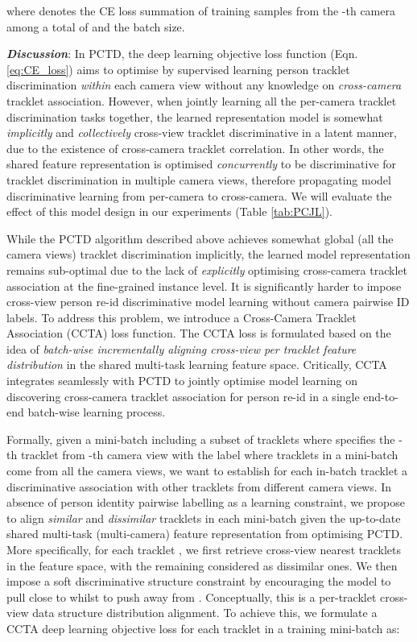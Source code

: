 \documentclass[runningheads]{llncs}
\begin{document}
where  denotes the CE loss summation of training samples
from the -th camera among a total of  and 
 the batch size.


\textbf{\em Discussion}: 
In PCTD, the deep learning objective loss function
(Eqn. \eqref{eq:CE_loss}) aims to optimise by supervised learning
person tracklet discrimination {\em within} each camera view without
any knowledge on {\em cross-camera} tracklet association. 
However, when jointly learning all the per-camera tracklet
discrimination tasks together, the learned representation model is
somewhat {\em implicitly} and {\em collectively} cross-view
tracklet discriminative in a latent manner, due to the existence of cross-camera tracklet
correlation.
In other words,
the shared feature representation is optimised {\em concurrently} to
be discriminative for tracklet discrimination in multiple camera
views, therefore propagating model discriminative learning from per-camera
to cross-camera. We will evaluate the effect of this model design in
our experiments (Table \ref{tab:PCJL}).


While the PCTD algorithm described above 
achieves somewhat global (all the camera views) tracklet discrimination implicitly, the learned
model representation remains sub-optimal due to the lack of {\em
  explicitly} optimising cross-camera tracklet association at the
fine-grained instance level.
It is significantly harder to impose cross-view person re-id
discriminative model learning without camera pairwise ID labels.
To address this problem,
we introduce a Cross-Camera Tracklet Association (CCTA) loss function.
The CCTA loss is formulated based on the idea of 
{\em batch-wise incrementally aligning cross-view per tracklet feature
  distribution} in the shared multi-task learning feature
space. 
Critically, CCTA integrates seamlessly with PCTD to jointly optimise
model learning on discovering cross-camera tracklet association for
person re-id in a single end-to-end batch-wise learning process.

Formally, given a mini-batch including a subset of tracklets
 where  specifies
the -th tracklet from -th camera view with
the label  where tracklets in a mini-batch come from all the
camera views,
we want to establish for each in-batch tracklet a discriminative
association with other tracklets from different camera views.
In absence of person identity pairwise labelling as a learning constraint,
we propose to align {\em similar} and {\em dissimilar} tracklets in each
mini-batch given the up-to-date shared multi-task (multi-camera)
feature representation from optimising PCTD.
More specifically,
for each tracklet , 
we first retrieve  cross-view nearest tracklets 
in the feature space,
with the remaining 
considered as dissimilar ones.
We then impose a soft discriminative structure constraint
by encouraging the model to pull 
close to  whilst 
to push away  from .
Conceptually, this is a per-tracklet cross-view
data structure distribution alignment.
To achieve this, 
we formulate a CCTA deep learning objective loss for each tracklet  in a training mini-batch as:
\end{document}
